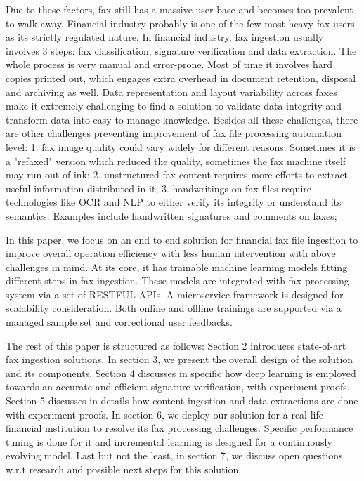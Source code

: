 \documentclass[sigconf]{acmart}
\begin{document}
Due to these factors, fax still has a massive user base and becomes too prevalent to walk away. Financial industry probably is one of the few most heavy fax users as its strictly regulated nature. In financial industry, fax ingestion usually involves 3 steps: fax classification, signature verification and data extraction. The whole process is very manual and error-prone. Most of time it involves hard copies printed out, which engages extra overhead in document retention, disposal and archiving as well. Data representation and layout variability across faxes make it extremely challenging to find a solution to validate data integrity and transform data into easy to manage knowledge.  Besides all these challenges, there are other challenges preventing improvement of fax file processing automation level:
1. fax image quality could vary widely for different reasons. Sometimes it is a "refaxed" version which reduced the quality, sometimes the fax machine itself may run out of ink;
2. unstructured fax content requires more efforts to extract useful information distributed in it;
3. handwritings on fax files require technologies like OCR and NLP to either verify its integrity or understand its semantics. Examples include handwritten signatures and comments on faxes;


In this paper, we focus on an end to end solution for financial fax file ingestion to improve overall operation efficiency with less human intervention with above challenges in mind. At its core, it has trainable machine learning models fitting different steps in fax ingestion. These models are integrated with fax processing system via a set of RESTFUL APIs. A microservice framework is designed for scalability consideration. Both online and offline trainings are supported via a managed sample set and correctional user feedbacks.
 
The rest of this paper is structured as follows: Section 2 introduces state-of-art fax ingestion solutions. In section 3, we present the overall design of the solution and its components. Section 4 discusses in specific how deep learning is employed towards an accurate and efficient signature verification, with experiment proofs. Section 5 discusses in details how content ingestion and data extractions are done with experiment proofs. In section 6, we deploy our solution for a real life financial institution to resolve its fax processing challenges. Specific performance tuning is done for it and incremental learning is designed for a continuously evolving model. Last but not the least, in section 7, we discuss open questions w.r.t research and possible next steps for this solution.
\end{document}
